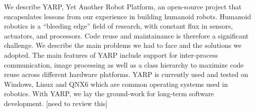 
We describe YARP, Yet Another Robot Platform, an open-source project
that encapsulates lessons from our experience in building humanoid
robots.  Humanoid robotics is a ``bleeding edge'' field of 
research, with constant flux in sensors, actuators, and 
processors.  Code reuse and maintainance is therefore a significant 
challenge. We describe the main problems we had to face and the 
solutions we adopted. The main features of YARP include support for inter-process
communication, image processing as well as a class hierarchy
to maximize code reuse across different hardware platforms. YARP
is currently used and tested on Windows, Linux and QNX6 which are common 
operating systems used in robotics. With YARP, we lay the ground-work for long-term
software development. [need to review this]
